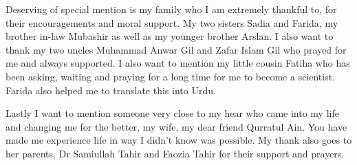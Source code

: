 Deserving of special mention is my family  who I am extremely thankful to, for their encouragements and moral support. My two sisters Sadia and Farida, my brother in-law Mubashir as well as my younger brother Arslan. I also want to thank my two uncles Muhammad Anwar Gil and Zafar Islam Gil who prayed for me and always supported. I also want to mention my little cousin Fatiha who has been asking, waiting and praying for a long time for me to become a scientist. Farida also helped me to translate this into Urdu.

Lastly I want to mention someone very close to my hear who came into my life and changing me for the better, my wife, my dear friend Qurratul Ain. You have made me experience life in way I didn't know was possible. My thank also goes to her parents, Dr Samiullah Tahir and Faozia Tahir for their support and prayers.

